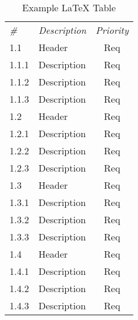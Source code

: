 \begin{table}[H]
\begin{tabular}{llc}
   \toprule
   \rowcolor{RowHeader}
   \multicolumn{3}{l}{\textbf{1 Section}} \\
   \toprule
   \textit{\#} & \textit{Description} & \textit{Priority} \\ 
   \midrule
   1.1 & Header & Req \\
     1.1.1 & \hspace{3mm} Description & Req \\
     1.1.2 & \hspace{3mm} Description & Req \\
     1.1.3 & \hspace{3mm} Description & Req \\
   1.2 & Header & Req \\
     1.2.1 & \hspace{3mm} Description & Req \\
     1.2.2 & \hspace{3mm} Description & Req \\
     1.2.3 & \hspace{3mm} Description & Req \\
   1.3 & Header & Req \\
     1.3.1 & \hspace{3mm} Description & Req \\
     1.3.2 & \hspace{3mm} Description & Req \\
     1.3.3 & \hspace{3mm} Description & Req \\
   1.4 & Header & Req \\
     1.4.1 & \hspace{3mm} Description & Req \\
     1.4.2 & \hspace{3mm} Description & Req \\
     1.4.3 & \hspace{3mm} Description & Req \\
   
   
   \bottomrule
   \end{tabular}
   \caption{Example LaTeX Table} 
   \label{tab:example2}
\end{table}





